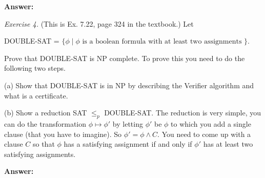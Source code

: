 \documentclass[11pt]{article}
\begin{document}
\textbf{Answer:}
\bigskip

\emph{Exercise 4.} (This is Ex. 7.22, page 324 in the textbook.) Let
\smallskip

\quad \quad DOUBLE-SAT = $\{\phi \mid \phi \textrm{ is a boolean formula with at least two assignments } \}$.
\smallskip

Prove that DOUBLE-SAT is NP complete.   To prove this you need to do the following two steps.
\smallskip

(a) Show that DOUBLE-SAT is in NP by describing the Verifier algorithm and what is a certificate.
\smallskip

(b) Show a reduction SAT $\leq_p$ DOUBLE-SAT. The reduction is very simple, you can do the transformation $\phi \mapsto \phi'$ by letting $\phi'$ be $\phi$ to which you add a single clause (that you have to imagine). So $\phi' = \phi \wedge C$. You need to come up with a clause $C$ so that $\phi$ has a satisfying assignment if and only if $\phi'$ has at least two satisfying assignments.

\textbf{Answer:}
\end{document}
